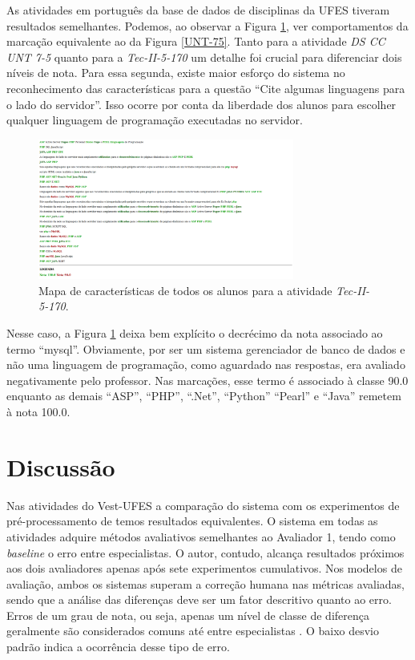 As atividades em português da base de dados de disciplinas da UFES tiveram resultados semelhantes. Podemos, ao observar a Figura \ref{Ufes170}, ver comportamentos da marcação equivalente ao da Figura \ref{UNT-75}. Tanto para a atividade \textit{DS CC UNT 7-5} quanto para a \textit{Tec-II-5-170} um detalhe foi crucial para diferenciar dois níveis de nota. Para essa segunda, existe maior esforço do sistema no reconhecimento das características para a questão ``Cite algumas linguagens para o lado do servidor''. Isso ocorre por conta da liberdade dos alunos para escolher qualquer linguagem de programação executadas no servidor.


\begin{figure}
\centering
\includegraphics[angle=90, width=0.75\textwidth]{img/Ufes170.png}
\caption{Mapa de características de todos os alunos para a atividade \textit{Tec-II-5-170}.}
\label{Ufes170}
\end{figure}

Nesse caso, a Figura \ref{Ufes170} deixa bem explícito o decrécimo da nota associado ao termo ``mysql''. Obviamente, por ser um sistema gerenciador de banco de dados e não uma linguagem de programação, como aguardado nas respostas, era avaliado negativamente pelo professor. Nas marcações, esse termo é associado à classe 90.0 enquanto as demais ``ASP'', ``PHP'', ``.Net'', ``Python'' ``Pearl'' e ``Java'' remetem à nota 100.0.

\section{Discussão}
Nas atividades do Vest-UFES a comparação do sistema com os experimentos de pré-processamento de \cite{pissinati2014-master} temos resultados equivalentes. O sistema em todas as atividades adquire métodos avaliativos semelhantes ao Avaliador 1, tendo como \textit{baseline} o erro entre especialistas. O autor, contudo, alcança resultados próximos aos dois avaliadores apenas após sete experimentos cumulativos. Nos modelos de avaliação, ambos os sistemas superam a correção humana nas métricas avaliadas, sendo que a análise das diferenças deve ser um fator descritivo quanto ao erro. Erros de um grau de nota, ou seja, apenas um nível de classe de diferença geralmente são considerados comuns até entre especialistas \cite{bazelato2013}. O baixo desvio padrão indica a ocorrência desse tipo de erro.

